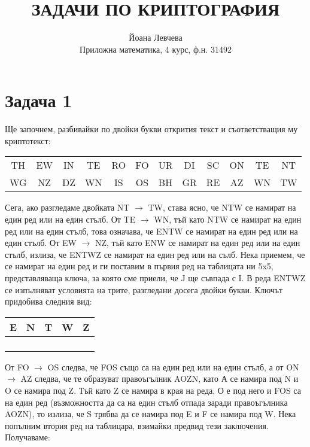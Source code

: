 \documentclass{article}
\title{ЗАДАЧИ ПО КРИПТОГРАФИЯ}
\author{Йоана Левчева\\ Приложна математика, 4 курс, ф.н. 31492}
\begin{document}
\maketitle

\section*{Задача 1}
\justify

Ще започнем, разбивайки по двойки букви открития текст и съответстващия му криптотекст:

\begin{center}
\begin{tabular}{ c c c c c c c c c c c c }

 TH & EW & IN & TE & RO & FO & UR & DI & SC & ON & TE & NT \\ 
 WG & NZ & DZ & WN & IS & OS & BH & GR & RE & AZ & WN & TW    

\end{tabular}
\end{center}

\justify
Сега, ако разгледаме двойката NT $\rightarrow$ TW, става ясно, че NTW се намират на един ред или на един стълб. От TE $\rightarrow$ WN, тъй като NTW се намират на един ред или на един стълб, това означава, че ENTW се намират на един ред или на един стълб. От EW $\rightarrow$ NZ, тъй като ENW се намират на един ред или на един стълб, излиза, че ENTWZ се намират на един ред или на сълб. Нека приемем, че се намират на един ред и ги поставим в първия ред на таблицата ни 5x5, представляваща ключа, за която сме приели, че J ще съвпада с I. В реда ENTWZ се изпълняват условията на трите, разгледани досега двойки букви. Ключът придобива следния вид:

\begin{center}
\begin{tabular}{|c|c|c|c|c|}
        \hline
        E & N & T & W & Z \\
        \hline
         &  &  &  &  \\
        \hline
         &  &  &  &  \\
        \hline
         &  &  &  &  \\
        \hline
         &  &  &  &  \\
        \hline
        \end{tabular}
\end{center}

\justify
От FO $\rightarrow$ OS следва, че FOS също са на един ред или на един стълб, а от ON $\rightarrow$ AZ следва, че те образуват правоъгълник AOZN, като А се намира под N и O се намира под Z. Тъй като Z се намира в края на реда, О е под него и FOS са на един ред (възможността да са на един стълб отпада заради правоъгълника AOZN), то излиза, че S трябва да се намира под E и F се намира под W. Нека попълним втория ред на таблицара, взимайки предвид тези заключения. Получаваме:
\end{document}
